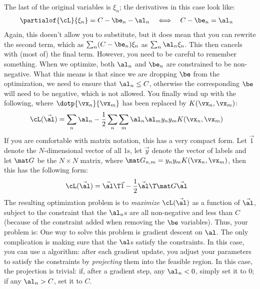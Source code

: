 The last of the original variables is $\xi_n$; the derivatives in this
case look like:
%
\begin{align}
\partialof{\cL}{\xi_n}
&= C - \be_n - \al_n
\quad \Longleftrightarrow \quad
C - \be_n = \al_n
\end{align}
%
Again, this doesn't allow you to substitute, but it does mean that you
can rewrite the second term, which as $\sum_n (C-\be_n)\xi_n$ as
$\sum_n \al_n \xi_n$.  This then cancels with (most of) the final
term.  However, you need to be careful to remember something.  When we
optimize, both $\al_n$ and $\be_n$ are constrained to be non-negative.
What this means is that since we are dropping $\be$ from the
optimization, we need to ensure that $\al_n \leq C$, otherwise the
corresponding $\be$ will need to be negative, which is not allowed.
You finally wind up with the following, where $\dotp{\vx_n}{\vx_m}$
has been replaced by $K(\vx_n,\vx_m)$:
%
\begin{align}
\cL(\vec\al)
&=
\sum_n \al_n
- \frac 1 2
    \sum_n \sum_m \al_n \al_m y_n y_m K(\vx_n,\vx_m)
\end{align}
%
If you are comfortable with matrix notation, this has a very compact
form.  Let $\vec 1$ denote the $N$-dimensional vector of all $1$s,
let $\vec y$ denote the vector of labels and let $\mat G$ be the $N
\times N$ matrix, where $\mat G_{n,m} = y_n y_m K(\vx_n, \vx_m)$, then this
has the following form:
%
\begin{align}
\cL(\vec\al)
&=
\vec\al\T\vec 1
- \frac 1 2 \vec\al\T \mat G \vec\al
\end{align}
%
The resulting optimization problem is to \emph{maximize}
$\cL(\vec\al)$ as a function of $\vec\al$, subject to the constraint
that the $\al_n$s are all non-negative and less than $C$ (because of
the constraint added when removing the $\be$ variables).  Thus, your
problem is:
%
%
One way to solve this problem is gradient descent on $\al$.  The only
complication is making sure that the $\al$s satisfy the constraints.
In this case, you can use a  algorithm:
after each gradient update, you adjust your parameters to satisfy the
constraints by \emph{projecting} them into the feasible region.  In
this case, the projection is trivial: if, after a gradient step, any
$\al_n < 0$, simply set it to $0$; if any $\al_n > C$, set it to $C$.

